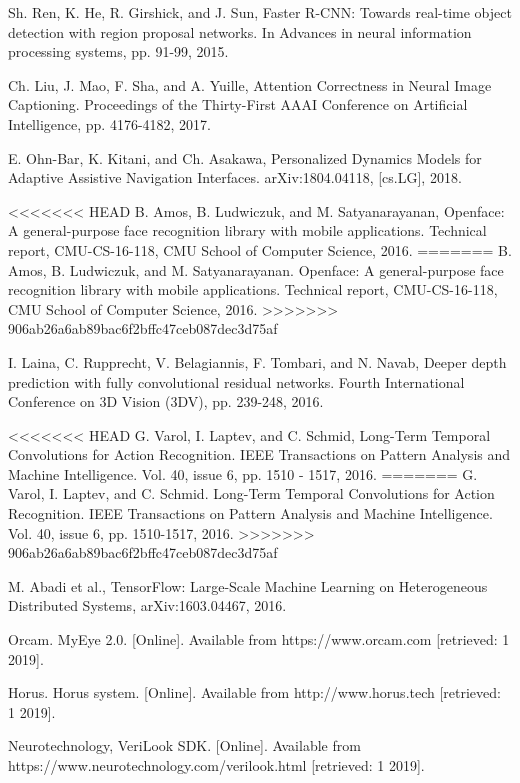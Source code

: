 \documentclass[10pt,conference,compsocconf]{IEEEtran}
\begin{document}
\begin{thebibliography}{99}
 Sh. Ren, K. He, R. Girshick, and J. Sun,  Faster R-CNN: Towards real-time object detection with region proposal networks. In Advances in neural information processing systems, pp. 91-99, 2015.




 Ch. Liu, J. Mao, F. Sha, and A. Yuille, Attention Correctness in Neural Image Captioning. Proceedings of the Thirty-First AAAI Conference on Artificial Intelligence, pp. 4176-4182, 2017.

 E. Ohn-Bar, K. Kitani, and Ch. Asakawa, Personalized Dynamics Models for Adaptive Assistive Navigation Interfaces. arXiv:1804.04118, [cs.LG], 2018.




<<<<<<< HEAD
 B. Amos, B. Ludwiczuk, and M. Satyanarayanan, Openface:
A general-purpose face recognition library with mobile applications. Technical report, CMU-CS-16-118, CMU School of Computer Science, 2016.
=======
 B. Amos, B. Ludwiczuk, and M. Satyanarayanan. Openface: A general-purpose face recognition library with mobile applications. Technical report, CMU-CS-16-118, CMU School of Computer Science, 2016.
>>>>>>> 906ab26a6ab89bac6f2bffc47ceb087dec3d75af


 I. Laina, C. Rupprecht, V. Belagiannis, F. Tombari, and N. Navab, Deeper depth prediction with fully convolutional residual networks. Fourth International Conference on 3D Vision (3DV), pp. 239-248, 2016.


<<<<<<< HEAD
 G. Varol, I. Laptev, and C. Schmid, Long-Term Temporal Convolutions for Action Recognition.  IEEE Transactions on Pattern Analysis and Machine Intelligence. Vol. 40, issue 6, pp. 1510 - 1517, 2016.
=======
 G. Varol, I. Laptev, and C. Schmid. Long-Term Temporal Convolutions for Action Recognition.  IEEE Transactions on Pattern Analysis and Machine Intelligence. Vol. 40, issue 6, pp. 1510-1517, 2016.
>>>>>>> 906ab26a6ab89bac6f2bffc47ceb087dec3d75af

 M. Abadi et al., TensorFlow: Large-Scale Machine Learning on Heterogeneous Distributed Systems, arXiv:1603.04467, 2016. 


 Orcam. MyEye 2.0. [Online]. Available from https://www.orcam.com [retrieved: 1 2019].

 Horus. Horus system. [Online]. Available from http://www.horus.tech [retrieved: 1 2019].

 Neurotechnology, VeriLook SDK. [Online]. Available from https://www.neurotechnology.com/verilook.html [retrieved: 1 2019].


\end{thebibliography}




\end{document}
